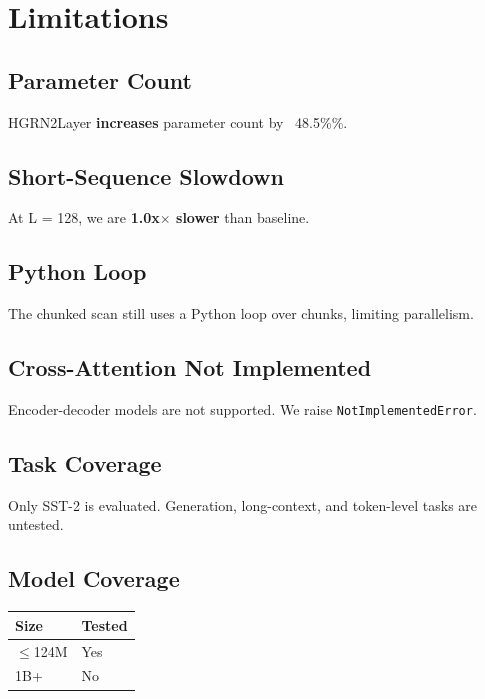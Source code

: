 \section{Limitations}

\subsection{Parameter Count}

HGRN2Layer \textbf{increases} parameter count by ~48.5\%\%.

\subsection{Short-Sequence Slowdown}

At L = 128, we are \textbf{1.0x$\times$ slower} than baseline.

\subsection{Python Loop}

The chunked scan still uses a Python loop over chunks, limiting parallelism.

\subsection{Cross-Attention Not Implemented}

Encoder-decoder models are not supported. We raise \texttt{NotImplementedError}.

\subsection{Task Coverage}

Only SST-2 is evaluated. Generation, long-context, and token-level tasks 
are untested.

\subsection{Model Coverage}

\begin{table}[H]
\centering
\small
\begin{tabular}{ll}
\toprule
\textbf{Size} & \textbf{Tested} \\
\midrule
$\le$124M & Yes \\
1B+ & No \\
\bottomrule
\end{tabular}
\end{table}

